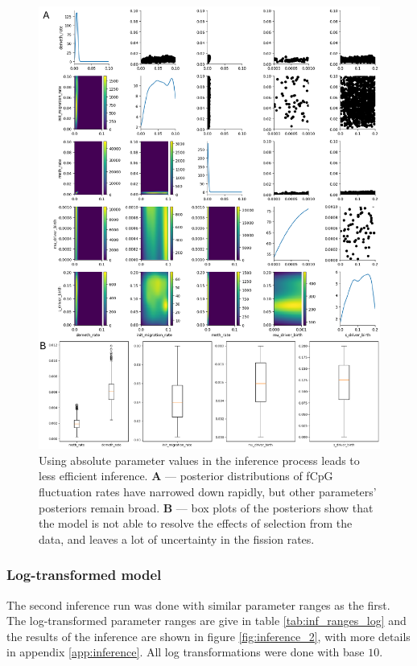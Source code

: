 \begin{figure}[h]
    \centering
    \includegraphics[width=\textwidth]{Chapter_5/figures/inference_raw/inference_1.pdf}
    \caption{Using absolute parameter values in the inference process leads to
    less efficient inference. \textbf{A} --- posterior distributions of fCpG
    fluctuation rates have narrowed down rapidly, but other parameters'
    posteriors remain broad. \textbf{B} --- box plots of the posteriors show
    that the model is not able to resolve the effects of selection from the
    data, and leaves a lot of uncertainty in the fission rates.}
    \label{fig:inference_1}
\end{figure}
\clearpage

\subsubsection{Log-transformed model}
The second inference run was done with similar parameter ranges as the first.
The log-transformed parameter ranges are give in table \ref{tab:inf_ranges_log}
and the results of the inference are shown in figure \ref{fig:inference_2}, with
more details in appendix \ref{app:inference}. All log transformations were
done with base $10$.

